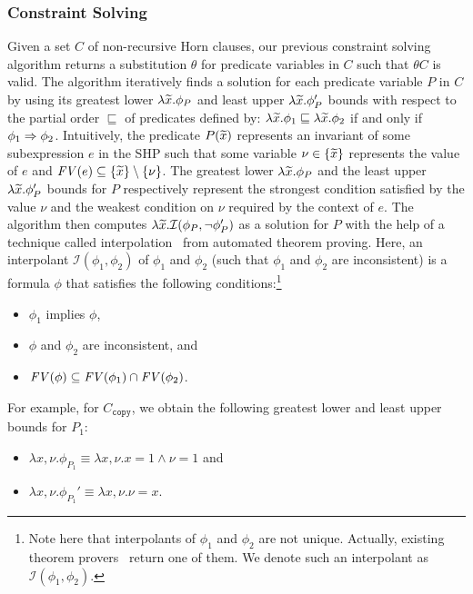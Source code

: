 \subsubsection{Constraint Solving}
\label{sec:cs}

Given a set \(C\) of non-recursive Horn clauses, our previous constraint 
solving algorithm returns a substitution \(\theta\) for predicate 
variables in \(C\) such that \(\theta C\) is valid.
The algorithm iteratively finds a solution for each predicate variable 
\(P\) in \(C\) by using its greatest lower \(\lambda \widetilde{x}.\phi_{P}\) 
and least upper \(\lambda \widetilde{x}.\phi_{P}'\) bounds with respect to the 
partial order \(\sqsubseteq\) of predicates defined by: \(\lambda 
\widetilde{x}.\phi_1 \sqsubseteq \lambda \widetilde{x}.\phi_2\) if and only if 
\(\phi_1 \Rightarrow \phi_2\).  
%
Intuitively, the predicate \(P(\widetilde{x})\) represents an invariant of 
some subexpression \(e\) in the SHP such that some variable \(\nu \in 
\{{\widetilde{x}}\}\) represents the value of \(e\) and \(\mathit{FV}({e}) \subseteq 
\{{\widetilde{x}}\} \setminus \{{\nu}\}\).  The greatest lower \(\lambda 
\widetilde{x}.\phi_P\) and the least upper \(\lambda \widetilde{x}.\phi_{P}'\) 
bounds for \(P\) respectively represent the strongest condition 
satisfied by the value \(\nu\) and the weakest condition on \(\nu\) 
required by the context of \(e\).
%
The algorithm then computes \(\lambda \widetilde{x}.\mathcal{I}(\phi_P,\neg 
\phi_P')\) as a solution for \(P\) with the help of a technique called 
interpolation~\cite{Henzinger2004,McMillan2005} from automated theorem 
proving.  Here, an interpolant \(\mathcal{I}(\phi_1,\phi_2)\) of 
\(\phi_1\) and \(\phi_2\) (such that \(\phi_1\) and \(\phi_2\) are 
inconsistent) is a formula \(\phi\) that satisfies the following 
conditions:\footnote{Note here that interpolants of \(\phi_1\) and 
\(\phi_2\) are not unique.  Actually, existing theorem 
provers~\cite{Henzinger2004,McMillan2005,Beyer2008} return one of them. 
We denote such an interpolant as \(\mathcal{I}(\phi_1,\phi_2)\).}
\begin{itemize}
\item \(\phi_1\) implies \(\phi\),
\item \(\phi\) and \(\phi_2\) are inconsistent, and
\item \(\mathit{FV}({\phi}) \subseteq \mathit{FV}({\phi_1}) \cap \mathit{FV}({\phi_2})\).
\end{itemize}
%
For example, for \(C_{\texttt{copy}}\), we obtain the following greatest 
lower and least upper bounds for \(P_1\):
\begin{itemize}
\item \(\lambda x,\nu.\phi_{P_1}\equiv \lambda x,\nu.x=1 \land \nu=1\) and
\item \(\lambda x,\nu.\phi_{P_1}'\equiv \lambda x,\nu.\nu=x\).
\end{itemize}
